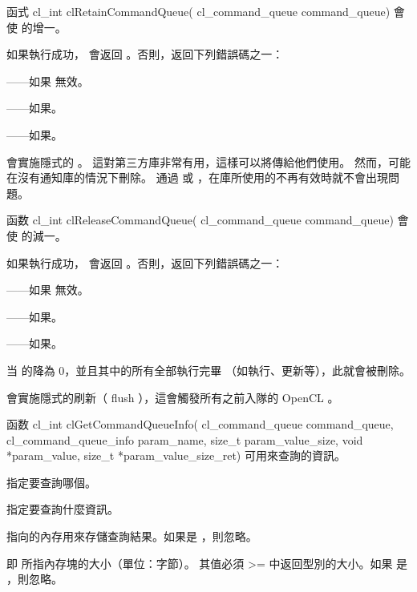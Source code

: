 函式
\startCLFUNC
cl_int clRetainCommandQueue(
		cl_command_queue command_queue)
\stopCLFUNC
會使  的增一。

如果執行成功， 會返回 。否則，返回下列錯誤碼之一：
\startigBase
\item {}——如果  無效。
\item {}——如果\scdevfailres。
\item {}——如果\schostfailres。
\stopigBase

 會實施隱式的 。
這對第三方庫非常有用，這樣可以將傳給他們使用。
然而，可能在沒有通知庫的情況下刪除。
通過  或  ，在庫所使用的不再有效時就不會出現問題。

函数
\startCLFUNC
cl_int clReleaseCommandQueue(
		cl_command_queue command_queue)
\stopCLFUNC
會使  的減一。

如果執行成功， 會返回 。否則，返回下列錯誤碼之一：
\startigBase
\item {}——如果  無效。
\item {}——如果\scdevfailres。
\item {}——如果\schostfailres。
\stopigBase

当  的降為 0，並且其中的所有全部執行完畢
（如執行、更新等），此就會被刪除。

會實施隱式的刷新（ flush ），這會觸發所有之前入隊的 OpenCL 。

函数
\startCLFUNC
cl_int clGetCommandQueueInfo(
		cl_command_queue command_queue,
		cl_command_queue_info param_name,
		size_t param_value_size,
		void *param_value,
		size_t *param_value_size_ret)
\stopCLFUNC
可用來查詢的資訊。

 指定要查詢哪個。

 指定要查詢什麼資訊。

 指向的內存用來存儲查詢結果。如果是 ，則忽略。

 即  所指內存塊的大小（單位：字節）。
其值必須 >= 中返回型別的大小。如果  是 ，則忽略。

